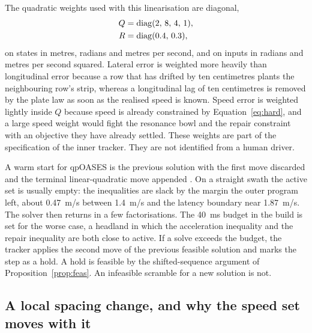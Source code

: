 The quadratic weights used with this linearisation are diagonal,
\begin{equation}
\label{eq:QR}
\begin{aligned}
Q &= \operatorname{diag}(2,\, 8,\, 4,\, 1),\\
R &= \operatorname{diag}(0.4,\, 0.3),
\end{aligned}
\end{equation}
on states in metres, radians and metres per second, and on inputs in radians and metres per second squared. Lateral error is weighted more heavily than longitudinal error because a row that has drifted by ten centimetres plants the neighbouring row's strip, whereas a longitudinal lag of ten centimetres is removed by the plate law as soon as the realised speed is known. Speed error is weighted lightly inside \(Q\) because speed is already constrained by Equation~\eqref{eq:hard}, and a large speed weight would fight the resonance bowl and the repair constraint with an objective they have already settled. These weights are part of the specification of the inner tracker. They are not identified from a human driver.

A warm start for qpOASES is the previous solution with the first move discarded and the terminal linear-quadratic move appended \cite{ferreau2014,mayne2000}. On a straight swath the active set is usually empty: the inequalities are slack by the margin the outer program left, about \SI{0.47}{m/s} between \SI{1.4}{m/s} and the latency boundary near \SI{1.87}{m/s}. The solver then returns in a few factorisations. The \SI{40}{ms} budget in the build is set for the worse case, a headland in which the acceleration inequality and the repair inequality are both close to active. If a solve exceeds the budget, the tracker applies the second move of the previous feasible solution and marks the step as a hold. A hold is feasible by the shifted-sequence argument of Proposition~\ref{prop:feas}. An infeasible scramble for a new solution is not.

\subsection{A local spacing change, and why the speed set moves with it}

